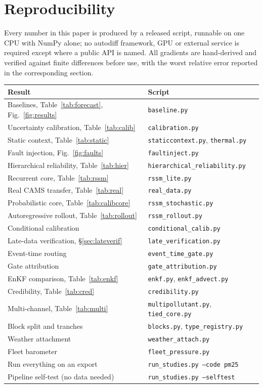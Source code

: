 \documentclass[10pt]{article}
\begin{document}
\section*{Reproducibility}
Every number in this paper is produced by a released script, runnable on one CPU
with NumPy alone; no autodiff framework, GPU or external service is required
except where a public API is named. All gradients are hand-derived and verified
against finite differences before use, with the worst relative error reported in
the corresponding section.

\begin{center}
\small
\begin{tabular}{@{}ll@{}}
\toprule
Result & Script \\
\midrule
Baselines, Table~\ref{tab:forecast}, Fig.~\ref{fig:results} & \texttt{baseline.py} \\
Uncertainty calibration, Table~\ref{tab:calib} & \texttt{calibration.py} \\
Static context, Table~\ref{tab:static} & \texttt{staticcontext.py}, \texttt{thermal.py} \\
Fault injection, Fig.~\ref{fig:faults} & \texttt{faultinject.py} \\
Hierarchical reliability, Table~\ref{tab:hier} & \texttt{hierarchical\_reliability.py} \\
Recurrent core, Table~\ref{tab:rssm} & \texttt{rssm\_lite.py} \\
Real CAMS transfer, Table~\ref{tab:real} & \texttt{real\_data.py} \\
Probabilistic core, Table~\ref{tab:calibcore} & \texttt{rssm\_stochastic.py} \\
Autoregressive rollout, Table~\ref{tab:rollout} & \texttt{rssm\_rollout.py} \\
Conditional calibration & \texttt{conditional\_calib.py} \\
Late-data verification, \S\ref{sec:lateverif} & \texttt{late\_verification.py} \\
Event-time routing & \texttt{event\_time\_gate.py} \\
Gate attribution & \texttt{gate\_attribution.py} \\
EnKF comparison, Table~\ref{tab:enkf} & \texttt{enkf.py}, \texttt{enkf\_advect.py} \\
Credibility, Table~\ref{tab:cred} & \texttt{credibility.py} \\
Multi-channel, Table~\ref{tab:multi} & \texttt{multipollutant.py}, \texttt{tied\_core.py} \\
Block split and tranches & \texttt{blocks.py}, \texttt{type\_registry.py} \\
Weather attachment & \texttt{weather\_attach.py} \\
Fleet barometer & \texttt{fleet\_pressure.py} \\
\midrule
Run everything on an export & \texttt{run\_studies.py --code pm25} \\
Pipeline self-test (no data needed) & \texttt{run\_studies.py --selftest} \\
\bottomrule
\end{tabular}
\end{center}
\end{document}
